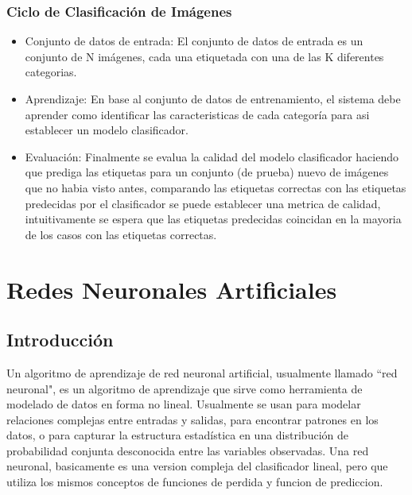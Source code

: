 \documentclass[a4paper,11pt,spanish]{book}
\begin{document}
	\subsubsection {Ciclo de Clasificación de Imágenes}
	  \begin{itemize}
	    \item Conjunto de datos de entrada: El conjunto de datos de entrada es un conjunto de N imágenes, cada una etiquetada con una de las K diferentes categorias.
	    \item Aprendizaje: En base al conjunto de datos de entrenamiento, el sistema debe aprender como identificar las caracteristicas de cada categoría para asi establecer un modelo clasificador.
	    \item Evaluación: Finalmente se evalua la calidad del modelo clasificador haciendo que prediga las etiquetas para un conjunto (de prueba) nuevo de imágenes que no habia visto antes, comparando las
	    etiquetas correctas con las etiquetas predecidas por el clasificador se puede establecer una metrica de calidad, intuitivamente se espera que las etiquetas predecidas coincidan en la mayoria
	    de los casos con las etiquetas correctas.
	  \end{itemize}
\fi


    \section{Redes Neuronales Artificiales}\label{sec:redes_neuronales}

      \subsection{Introducción}
	Un algoritmo de aprendizaje de red neuronal artificial, usualmente llamado ``red neuronal", es un algoritmo de aprendizaje que sirve como herramienta de modelado de datos
	en forma no lineal. Usualmente se usan para modelar relaciones complejas entre entradas y salidas,
	para encontrar patrones en los datos, o para capturar la estructura estadística en una distribución de probabilidad conjunta desconocida entre las variables observadas.
	Una red neuronal, basicamente es una version compleja del clasificador lineal, pero que utiliza los mismos conceptos de funciones de perdida y funcion de prediccion.
	  
\end{document}
